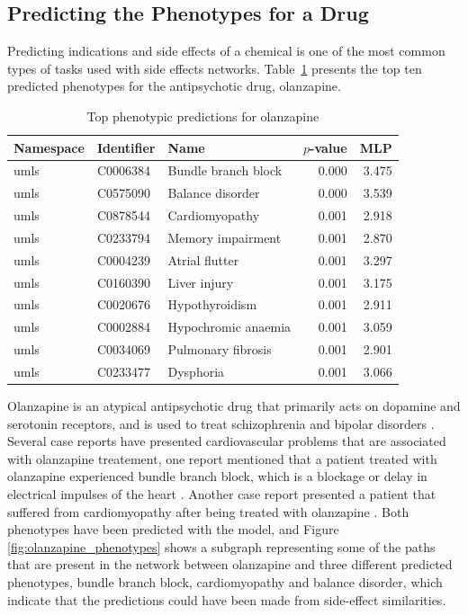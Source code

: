 \subsection{Predicting the Phenotypes for a Drug}

Predicting indications and side effects of a chemical is one of the most common types of tasks used with side effects networks.
Table~\ref{tab:drug_phenotype} presents the top ten predicted phenotypes for the antipsychotic drug, olanzapine.

\begin{table}[!ht]
    \centering
    \begin{tabular}{|l|l|l|r|r|} 
        \hline
        \textbf{Namespace} & \textbf{Identifier} & \textbf{Name} & \textbf{$p$-value} & \textbf{MLP} \\
        \hline
        umls & C0006384 & Bundle branch block & 0.000 & 3.475 \\
        \hline
        umls & C0575090 & Balance disorder & 0.000 & 3.539 \\
        \hline
        umls & C0878544 & Cardiomyopathy & 0.001 & 2.918 \\
        \hline
        umls & C0233794 & Memory impairment & 0.001 & 2.870 \\
        \hline
        umls & C0004239 & Atrial flutter & 0.001 & 3.297 \\
        \hline
        umls & C0160390 & Liver injury & 0.001 & 3.175 \\
        \hline
        umls & C0020676 & Hypothyroidism & 0.001 & 2.911 \\
        \hline
        umls & C0002884 & Hypochromic anaemia & 0.001 & 3.059 \\
        \hline
        umls & C0034069 & Pulmonary fibrosis & 0.001 & 2.901 \\
        \hline
        umls & C0233477 & Dysphoria & 0.001 & 3.066 \\
        \hline
    \end{tabular}
    \caption{Top phenotypic predictions for olanzapine}
    \label{tab:drug_phenotype}
\end{table}

Olanzapine is an atypical antipsychotic drug that primarily acts on dopamine and serotonin receptors, and is used to treat schizophrenia and bipolar disorders \cite{thomas_olanzapine_2019}.
Several case reports have presented cardiovascular problems that are associated with olanzapine treatement, one report mentioned that a patient treated with olanzapine experienced bundle branch block, which is a blockage or delay in electrical impulses of the heart \cite{ninan_case_2017}.
Another case report presented a patient that suffered from cardiomyopathy after being treated with olanzapine \cite{puttegowda_olanzapine_2016}.
Both phenotypes have been predicted with the model, and Figure \ref{fig:olanzapine_phenotypes} shows a subgraph representing some of the paths that are present in the network between olanzapine and three different predicted phenotypes, bundle branch block, cardiomyopathy and balance disorder, which indicate that the predictions could have been made from side-effect similarities.

